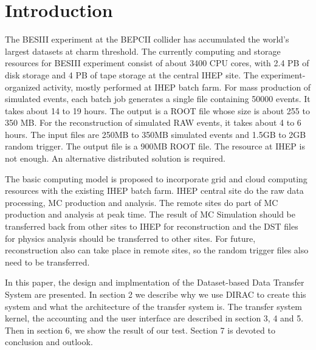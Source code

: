 \section{Introduction}
The BESIII experiment at the BEPCII collider has accumulated
the world's largest datasets at charm threshold.
%
The currently computing and storage resources for BESIII 
experiment consist of about 3400 CPU cores, with 2.4 PB of disk
storage and 4 PB of tape storage at the central IHEP site.
The experiment-organized activity, mostly performed at IHEP
batch farm. For mass production of simulated events,
each batch job generates a single file containing
50000 events. It takes about 14 to 19 hours. The output
is a ROOT file whose size is about 255 to 350 MB.
For the reconstruction of simulated RAW events,
it takes about 4 to 6 hours. The input files are
250MB to 350MB simulated events and 1.5GB to 2GB random trigger.
The output file is a 900MB ROOT file.
The resource at IHEP is not enough.
An alternative distributed solution is required.

The basic computing model is proposed to incorporate grid and
cloud computing resources with the existing IHEP batch farm.
IHEP central site do the raw data processing, MC production
and analysis. The remote sites do part of MC production
and analysis at peak time.
The result of MC Simulation should be transferred back
from other sites to IHEP for reconstruction
and the DST files for physics analysis should be transferred
to other sites. For future, reconstruction also can take place 
in remote sites, so the random trigger files also need to be 
transferred.

In this paper, the design and implmentation of 
the Dataset-based Data Transfer System are presented.
In section 2 we describe why we use DIRAC to create this system
and what the architecture of the transfer system is.
The transfer system kernel, the accounting and the user interface
are described in section 3, 4 and 5.
Then in section 6, we show the result of our test.
Section 7 is devoted to conclusion and outlook.

